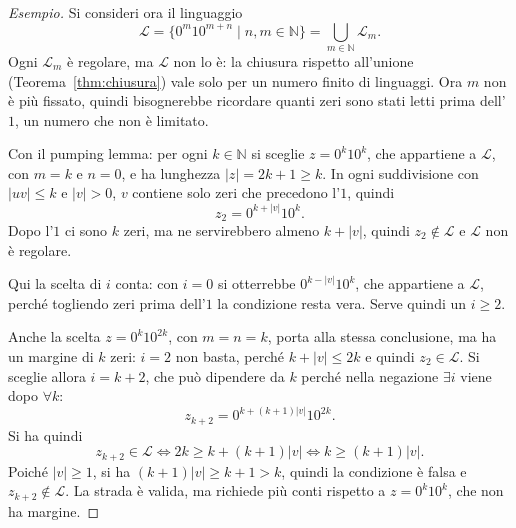 \documentclass[a4paper, 11pt, oneside]{book}
\theoremstyle{formale}
\newenvironment{esempio}
    {\begin{proof}[\textit{Esempio}]\renewcommand{\qedsymbol}{$\diamond$}}
    {\end{proof}}
\begin{document}
    \begin{esempio}
        Si consideri ora il linguaggio
        \begin{equation*}
            \mathcal{L} = \{0^m 1 0^{m+n} \mid n, m \in \mathbb{N}\}
            = \bigcup_{m \in \mathbb{N}} \mathcal{L}_m.
        \end{equation*}
        Ogni $\mathcal{L}_m$ \`e regolare, ma $\mathcal{L}$ non lo \`e: la chiusura
        rispetto all'unione (Teorema~\ref{thm:chiusura}) vale solo per un numero finito di
        linguaggi. Ora $m$ non \`e pi\`u fissato, quindi bisognerebbe ricordare quanti zeri
        sono stati letti prima dell'$1$, un numero che non \`e limitato.

        Con il pumping lemma: per ogni $k \in \mathbb{N}$ si sceglie $z = 0^k 1 0^k$, che
        appartiene a $\mathcal{L}$, con $m = k$ e $n = 0$, e ha lunghezza
        $|z| = 2k + 1 \geq k$. In ogni suddivisione con $|uv| \leq k$ e $|v| > 0$, $v$
        contiene solo zeri che precedono l'$1$, quindi
        \begin{equation*}
            z_2 = 0^{k + |v|} 1 0^k.
        \end{equation*}
        Dopo l'$1$ ci sono $k$ zeri, ma ne servirebbero almeno $k + |v|$, quindi
        $z_2 \notin \mathcal{L}$ e $\mathcal{L}$ non \`e regolare.

        Qui la scelta di $i$ conta: con $i = 0$ si otterrebbe $0^{k - |v|} 1 0^k$, che
        appartiene a $\mathcal{L}$, perch\'e togliendo zeri prima dell'$1$ la condizione
        resta vera. Serve quindi un $i \geq 2$.

        Anche la scelta $z = 0^k 1 0^{2k}$, con $m = n = k$, porta alla stessa conclusione,
        ma ha un margine di $k$ zeri: $i = 2$ non basta, perch\'e $k + |v| \leq 2k$ e
        quindi $z_2 \in \mathcal{L}$. Si sceglie allora $i = k + 2$, che pu\`o dipendere da
        $k$ perch\'e nella negazione $\exists i$ viene dopo $\forall k$:
        \begin{equation*}
            z_{k+2} = 0^{k + (k + 1)|v|} 1 0^{2k}.
        \end{equation*}
        Si ha quindi
        \begin{equation*}
            z_{k+2} \in \mathcal{L}
            \iff 2k \geq k + (k + 1)|v|
            \iff k \geq (k + 1)|v|.
        \end{equation*}
        Poich\'e $|v| \geq 1$, si ha $(k + 1)|v| \geq k + 1 > k$, quindi la condizione \`e
        falsa e $z_{k+2} \notin \mathcal{L}$. La strada \`e valida, ma richiede pi\`u conti
        rispetto a $z = 0^k 1 0^k$, che non ha margine.
    \end{esempio}
\end{document}
